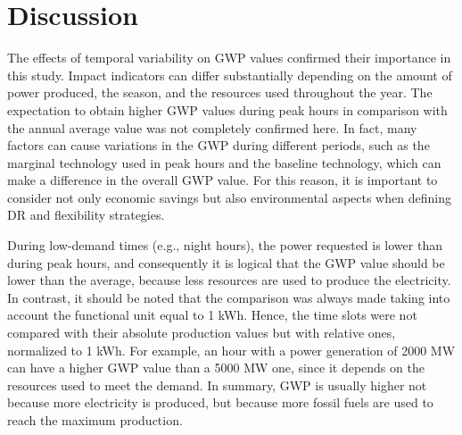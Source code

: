 {{{{%
\section{Discussion} \label{Discussion}

The effects of temporal variability on GWP values confirmed their importance in this study. Impact indicators can differ substantially depending on the amount of power produced, the season, and the resources used throughout the year. The expectation to obtain higher GWP values during peak hours in comparison with the annual average value was not completely confirmed here. In fact, many factors can cause variations in the GWP during different periods, such as the marginal technology used in peak hours and the baseline technology, which can make a difference in the overall GWP value. {For this reason, it is important to consider not only economic savings but also environmental aspects when defining DR and flexibility strategies.}



During low-demand times (e.g., night hours), the power requested is lower than during peak hours, and consequently it is logical that the GWP value should be lower than the average, because less resources are used to produce the electricity. In contrast, it should be noted that the comparison was always made taking into account the functional unit equal to 1 kWh. Hence, the time slots were not compared with their  absolute production values but with relative ones, normalized to 1 kWh. For example, an hour with a power generation of 2000 MW can have a higher GWP value than a 5000 MW one, since it depends on the resources used to meet the demand. In summary, GWP is usually higher not because more electricity is produced, but because more fossil fuels are used to reach the maximum production.


}}}}
